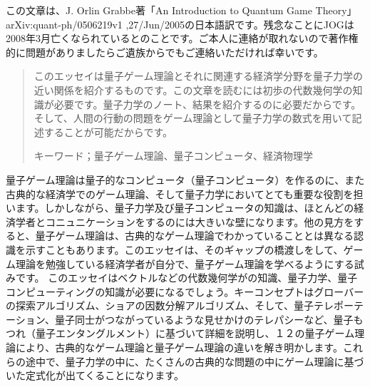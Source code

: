 この文章は、J. Orlin Grabbe著「An Introduction to Quantum Game Theory」arXiv:quant-ph/0506219v1 ,27/Jun/2005の日本語訳です。残念なことにJOGは2008年3月亡くなられているとのことです。ご本人に連絡が取れないので著作権的に問題がありましたらご遺族からでもご連絡いただければ幸いです。

\begin{abstract}

このエッセイは量子ゲーム理論とそれに関連する経済学分野を量子力学の近い関係を紹介するものです。この文章を読むには初歩の代数幾何学の知識が必要です。量子力学のノート、結果を紹介するのに必要だからです。そして、人間の行動の問題をゲーム理論として量子力学の数式を用いて記述することが可能だからです。

キーワード；量子ゲーム理論、量子コンピュータ、経済物理学
\end{abstract}

量子ゲーム理論は量子的なコンピュータ（量子コンピュータ）を作るのに、また古典的な経済学でのゲーム理論、そして量子力学においてとても重要な役割を担います。しかしながら、量子力学及び量子コンピュータの知識は、ほとんどの経済学者とコニュニケーションをするのには大きいな壁になります。他の見方をすると、量子ゲーム理論は、古典的なゲーム理論でわかっていることとは異なる認識を示すこともあります。このエッセイは、そのギャップの橋渡しをして、ゲーム理論を勉強している経済学者が自分で、量子ゲーム理論を学べるようにする試みです。
このエッセイはベクトルなどの代数幾何学がの知識、量子力学、量子コンピューティングの知識が必要になるでしょう。キーコンセプトはグローバーの探索アルゴリズム、ショアの因数分解アルゴリズム、そして、量子テレポーテーション、量子同士がつながっているような見せかけのテレパシーなど、量子もつれ（量子エンタングルメント）に基づいて詳細を説明し、１２の量子ゲーム理論により、古典的なゲーム理論と量子ゲーム理論の違いを解き明かします。これらの途中で、量子力学の中に、たくさんの古典的な問題の中にゲーム理論に基づいた定式化が出てくることになります。


